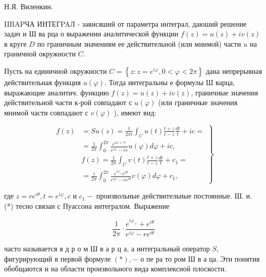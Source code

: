 \documentclass[10pt]{article}
\begin{document}
Н.Я. Виленкин.



IIBAPЧА ИНТЕГPAЛ - зависяший от параметра интеграл, даюший решение задач и Ш ва рца о выражении аналитической функции $f(z)=u(z)+i v(z)$ в круге $D$ по граничным значениям ее действительной (или мнимой) части $u$ на граничной окружности $C$.



Пусть на единичной окружности $C=\left\{z: z=e^{i \varphi}, 0<\varphi<2 \pi\right\}$ дана непрерывная действительная функция $u(\varphi)$. Тогда интегральны е формулы Ш варца, выражающие аналитич. функцию $f(z)=u(z)+i v(z)$, граничные значения действительной части к-рой совпадают с $u(\varphi)$ (или граничные значения мнимой части совпадают с $v(\varphi)$ ), имеют вид:



\[

\left.\begin{array}{rl}

f(z) & =S u(z)=\frac{1}{2 \pi i} \int_{C} u(t) \frac{t+z}{t-z} \frac{d t}{t}+i c= \\

& =\frac{1}{2 \pi} \int_{0}^{2 \pi} \frac{e^{i \varphi+r e}}{e^{i \varphi}-r e} u(\varphi) d \varphi+i c, \\

& f(z)=\frac{1}{2 \pi} \int_{C} v(t) \frac{t+z}{t-z} \frac{d t}{t}+c_{1}= \\

& =\frac{i}{2 \pi} \int_{0}^{2 \pi} \frac{e^{i \varphi_{+}} e^{i \theta}}{e^{i \varphi}-r e^{i \theta}} v(\varphi) d \varphi+c_{1},

\end{array}\right\}

\]



где $z=r e^{i \theta}, t=e^{i \varphi}, c$ и $c_{1}-$ произвольные действительные постоянные. Ш. и. (*) тесно связан с Пуассона интегралом. Выражение



\[

\frac{1}{2 \pi} \cdot \frac{e^{i \varphi_{+}}+e^{i \theta}}{e^{i \varphi}-r e^{i \theta}}

\]



часто называется я д р о м Ш в а р ц а, а интегральный оператор $S$, фигурирующий в первой формуле $(*),-$ о пе ра то ром Ш в а ца. Эти понятия обобщаются и на области произвольного вида комплексной плоскости.
\end{document}

